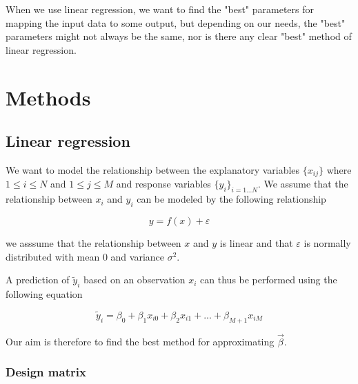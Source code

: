 \documentclass[12pt]{article}
\newcommand{\bbeta}{\vec{\beta}}
\begin{document}
When we use linear regression, we want to find the "best" parameters for mapping the input data to some output, but depending on our needs, the "best" parameters might not always be the same, nor is there any clear "best" method of linear regression.



\section{Methods}

\subsection{Linear regression}

We want to model the relationship between the explanatory variables $\{x_{ij}\}$ where $1\leq i \leq N$ and $1 \leq j \leq M$ and response variables $\{y_i\}_{i=1...N}$.
We assume that the relationship between $x_i$ and $y_i$ can be modeled by the following relationship

\begin{equation}
    y = f(x) + \varepsilon
\end{equation}

we asssume that the relationship between $x$ and $y$ is linear and that $\varepsilon$ is normally distributed with mean 0 and variance $\sigma^2$.

A prediction of $\tilde{y}_i$ based on an observation $x_i$ can thus be performed using the following equation

\begin{equation}
    \tilde{y}_i = \beta_0 + \beta_1 x_{i0} + \beta_2 x_{i1} + ... + \beta_{M+1} x_{iM}
\end{equation}

Our aim is therefore to find the best method for approximating $\bbeta$.


\subsubsection{Design matrix}
\end{document}
